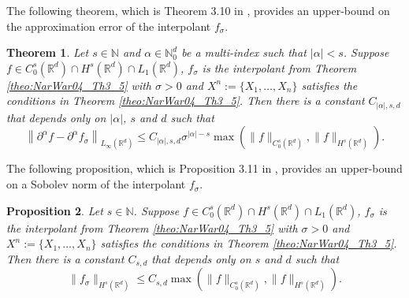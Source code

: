 \documentclass[11pt]{article}
\newtheorem{theorem}{Theorem}
\newtheorem{proposition}[theorem]{Proposition}
\theoremstyle{remark}
\theoremstyle{example}
\theoremstyle{remark}
\newcommand{\N}{\mathbb{N}}
\newcommand{\R}{\mathbb{R}}
\begin{document}
The following theorem, which is Theorem 3.10 in \cite{NarWar04}, provides an upper-bound on the approximation error of the interpolant $f_\sigma$.

\begin{theorem} \label{theo:NarWar04_Th3_10}
Let $s\in\N$ and $\alpha \in \N_0^{d}$ be a multi-index such that $| \alpha | < s$.
Suppose $f \in C_0^s(\R^d) \cap H^s(\R^d) \cap L_1(\R^d)$, $f_\sigma$ is the interpolant from Theorem \ref{theo:NarWar04_Th3_5} with $\sigma > 0$ and $X^n := \{X_1,\dots, X_n \}$ satisfies the conditions in Theorem \ref{theo:NarWar04_Th3_5}.
Then there is a constant $C_{|\alpha|, s, d}$ that depends only on $|\alpha|$, $s$ and $d$ such that 
\[
\left\| \partial^\alpha f -  \partial^\alpha f_\sigma \right\|_{L_\infty(\R^d)} \leq C_{|\alpha|, s, d} \sigma^{|\alpha| - s} \max\left( \| f \|_{C_0^s(\R^d)}, \| f \|_{H^s(\R^d)} \right).
\]
\end{theorem}

The following proposition, which is Proposition 3.11 in \cite{NarWar04}, provides an upper-bound on a Sobolev norm of the interpolant $f_\sigma$.
\begin{proposition} \label{prop:NarWar04_Prop3_11}
Let $s\in\N$. 
Suppose $f \in C_0^s(\R^d) \cap H^s(\R^d) \cap L_1(\R^d)$, 
$f_\sigma$ is the interpolant from Theorem \ref{theo:NarWar04_Th3_5} with $\sigma > 0$ and $X^n := \{X_1,\dots, X_n \}$ satisfies the conditions in Theorem \ref{theo:NarWar04_Th3_5}.
Then there is a constant $C_{s,d}$ that depends only on $s$ and $d$ such that
\[
\| f_\sigma \|_{H^s(\R^d)} \leq C_{s,d} \max \left( \| f \|_{C_0^s(\R^d)}, \| f \|_{H^s(\R^d)} \right).
\]
\end{proposition}
\end{document}
